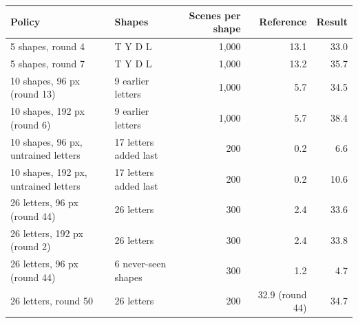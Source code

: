 \begin{tabular}{llrrr}
\toprule
Policy & Shapes & Scenes per shape & Reference & Result \\
\midrule
5 shapes, round 4 & T Y D L & 1{,}000 & 13.1 & 33.0 \\
5 shapes, round 7 & T Y D L & 1{,}000 & 13.2 & 35.7 \\
10 shapes, 96 px (round 13) & 9 earlier letters & 1{,}000 & 5.7 & 34.5 \\
10 shapes, 192 px (round 6) & 9 earlier letters & 1{,}000 & 5.7 & 38.4 \\
10 shapes, 96 px, untrained letters & 17 letters added last & 200 & 0.2 & 6.6 \\
10 shapes, 192 px, untrained letters & 17 letters added last & 200 & 0.2 & 10.6 \\
26 letters, 96 px (round 44) & 26 letters & 300 & 2.4 & 33.6 \\
26 letters, 192 px (round 2) & 26 letters & 300 & 2.4 & 33.8 \\
26 letters, 96 px (round 44) & 6 never-seen shapes & 300 & 1.2 & 4.7 \\
26 letters, round 50 & 26 letters & 200 & 32.9 (round 44) & 34.7 \\
\bottomrule
\end{tabular}
